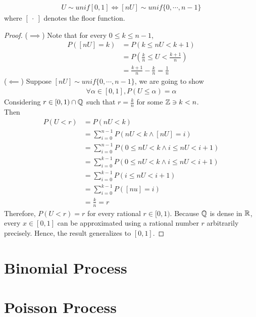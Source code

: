 \documentclass{article}
\begin{document}
   	\begin{theorem}[An Application]
   		\begin{align}
   			U \sim unif[0, 1] \iff [nU] \sim unif\{0, \cdots, n-1\}
   		\end{align}
   		where $[\ \cdot\ ]$ denotes the floor function.
   	\end{theorem}
   	
   	\begin{proof}
   		($\implies$) Note that for every $0 \leq k \leq n-1$,
   		\begin{align}
   			P([nU] = k) &= P(k \leq nU < k + 1) \\
   			&= P(\frac{k}{n} \leq U < \frac{k+1}{n}) \\
   			&= \frac{k+1}{n} - \frac{k}{n} = \frac{1}{n}
   		\end{align}
   		($\impliedby$)
   		Suppose $[nU] \sim unif\{0, \cdots, n-1\}$, we are going to show
   		\begin{align}
   			\forall \alpha \in [0, 1], P(U \leq \alpha) = \alpha
   		\end{align}
   		Considering $r \in [0, 1) \cap \mathbb{Q}$ such that $r = \frac{k}{n}$ for some $\mathbb{Z} \ni k < n$.\\
   		Then
   		\begin{align}
   			P(U < r) &= P(nU < k) \\
   			&= \sum_{i=0}^{n-1} P(nU < k \land [nU] = i) \\
   			&= \sum_{i=0}^{n-1} P(0 \leq nU < k \land i \leq nU < i+1) \\
   			&= \sum_{i=0}^{k-1} P(0 \leq nU < k \land i \leq nU < i+1) \\
   			&= \sum_{i=0}^{k-1}P(i \leq nU < i + 1) \\
   			&= \sum_{i=0}^{k-1}P([nu] = i) \\
   			&= \frac{k}{n} = r
   		\end{align}
   		Therefore, $P(U < r) = r$ for every rational $r \in [0, 1)$. Because $\mathbb{Q}$ is dense in $\mathbb{R}$, every $x \in [0, 1]$ can be approximated using a rational number $r$ arbitrarily precisely. Hence, the result generalizes to $[0, 1]$.
   	\end{proof}
   	
   	\section{Binomial Process}
   	
   	\section{Poisson Process}
   	
\end{document}
